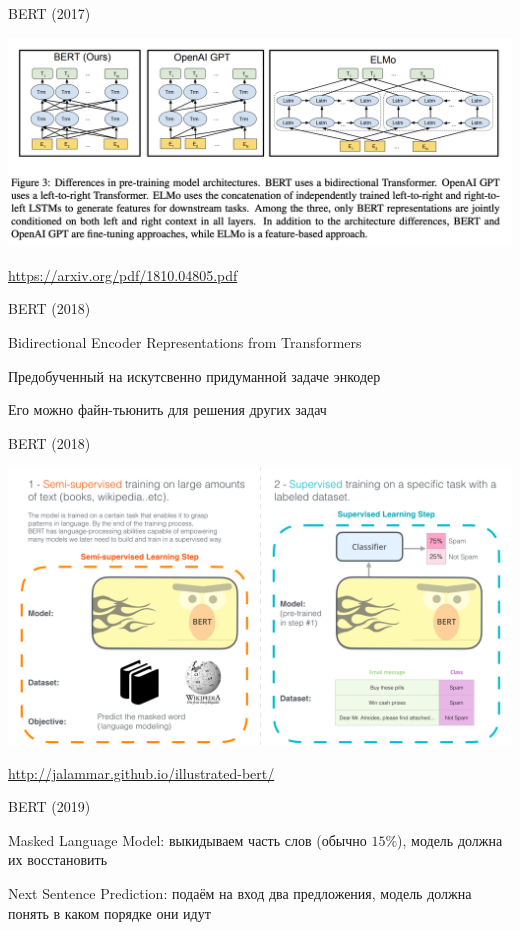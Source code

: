 \documentclass[notes,12pt, aspectratio=169]{beamer}
\newenvironment{wideitemize}{\itemize\addtolength{\itemsep}{10pt}}{\enditemize}
\begin{document}
\begin{frame}{BERT (2017)} 
	\begin{center}
		\includegraphics[width=.99\linewidth]{bert.png}
	\end{center}
	\vfill
	\footnotesize
	{\color{blue} \url{https://arxiv.org/pdf/1810.04805.pdf}}
\end{frame}


\begin{frame}{BERT (2018)}
	\begin{wideitemize}
		\item  \alert{Bidirectional Encoder Representations from Transformers} 
		\item Предобученный на искутсвенно придуманной задаче  энкодер
		\item Его можно файн-тьюнить для решения других задач 
	\end{wideitemize}
\end{frame}


\begin{frame}{BERT (2018)}
	\begin{center}
		\includegraphics[width=0.8\linewidth]{BERT_stud}
	\end{center}
	\vfill
	\footnotesize
	{\color{blue} \url{http://jalammar.github.io/illustrated-bert/}}
\end{frame}


\begin{frame}{BERT (2019)}
	\begin{wideitemize}
		\item  \alert{Masked Language Model: }  выкидываем часть слов (обычно $15\%$), модель должна их восстановить 
		\item  \alert{Next Sentence Prediction:}  подаём на вход два предложения, модель должна понять в каком порядке они идут 
	\end{wideitemize}
\end{frame}
\end{document}
